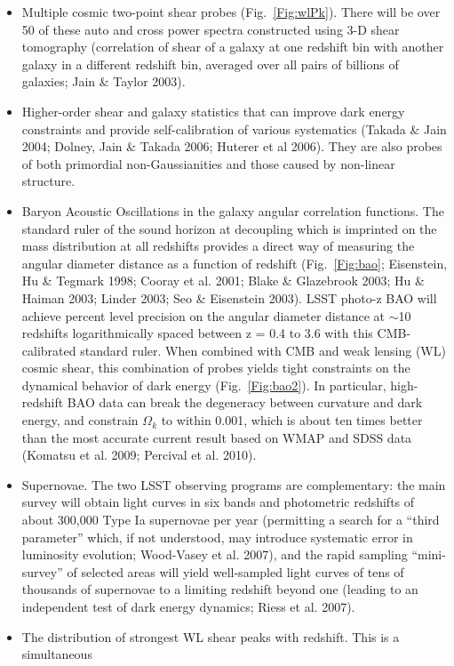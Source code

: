 \documentclass{emulateapj}
\begin{document}
\begin{itemize}
\item Multiple cosmic two-point shear probes (Fig.~\ref{Fig:wlPk}). There will be 
over 50 of these auto and cross power spectra constructed using 3-D shear tomography 
(correlation of shear of a galaxy at one redshift bin with another galaxy in 
a different redshift bin, averaged over all pairs of billions of galaxies; Jain \& Taylor 2003).
\item Higher-order shear and galaxy statistics that can improve dark energy 
constraints and provide self-calibration of various systematics (Takada \& Jain 2004; 
Dolney, Jain \& Takada 2006; Huterer et al 2006). They are also probes of both
primordial non-Gaussianities and those caused by non-linear structure.
\item Baryon Acoustic Oscillations in the galaxy angular correlation functions.
The standard ruler of the sound horizon at decoupling which is imprinted on the mass 
distribution at all redshifts provides a direct way of measuring the angular diameter
distance as a function of redshift (Fig.~\ref{Fig:bao}; Eisenstein, Hu \& Tegmark 1998;
Cooray et al. 2001; Blake \& Glazebrook 2003; Hu \& Haiman 2003; Linder 2003; Seo \& 
Eisenstein 2003). LSST photo-z BAO will achieve percent level precision on the angular 
diameter distance at $\sim$10 redshifts logarithmically spaced between z = 0.4 to 3.6 
with this CMB-calibrated standard ruler. When combined with CMB 
and weak lensing (WL) cosmic shear, this combination of probes yields tight constraints on the 
dynamical behavior of dark energy (Fig.~\ref{Fig:bao2}). In particular, high-redshift BAO data can break 
the degeneracy between curvature and dark energy, and constrain $\Omega_k$ to within 
0.001, which is about ten times better than the most accurate current result based on WMAP 
and SDSS data (Komatsu et al. 2009; Percival et al. 2010). 
\item Supernovae. The two LSST observing programs are complementary: the main survey will 
obtain light curves in six bands and photometric redshifts of about 300,000 Type
Ia supernovae per year (permitting a search for a ``third parameter'' which,
if not understood, may introduce systematic error in luminosity evolution; 
Wood-Vasey et al. 2007), and the rapid sampling ``mini-survey'' of selected
areas will yield well-sampled light curves of tens of thousands of supernovae
to a limiting redshift beyond one (leading to an independent test of dark energy 
dynamics; Riess et al. 2007). 
\item The distribution of strongest WL shear peaks with redshift. This is a simultaneous 

\end{itemize}
\end{document}
